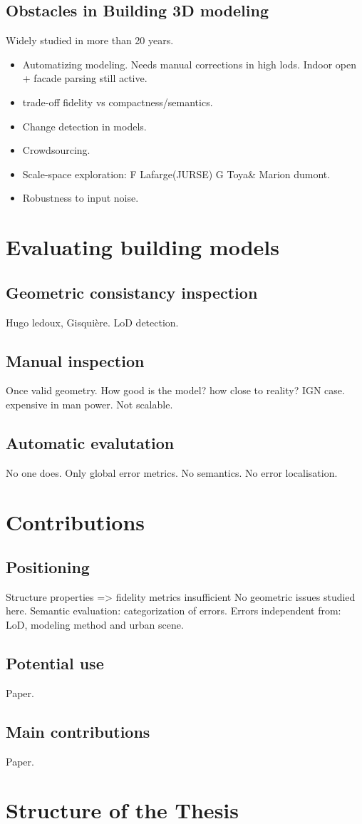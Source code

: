     \subsection{Obstacles in Building 3D modeling}
        \label{subsec::introduction::urban_3d_reconstruction::challenges}
        Widely studied in more than 20 years.\\
        \begin{itemize}
            \item Automatizing modeling. Needs manual corrections in high lods. Indoor open + facade parsing still active.
            \item trade-off fidelity vs compactness/semantics.
            \item Change detection in models.
            \item Crowdsourcing.
            \item Scale-space exploration: F Lafarge(JURSE) G Toya\& Marion dumont.
            \item Robustness to input noise.
        \end{itemize}
\section{Evaluating building models}
    \label{sec::introduction::building_model_evaluation}
    \subsection{Geometric consistancy inspection}
        Hugo ledoux, Gisquière. LoD detection.
    \subsection{Manual inspection}
        Once valid geometry. How good is the model? how close to reality?
        IGN case.
        expensive in man power. Not scalable.
    \subsection{Automatic evalutation}
        No one does. Only global error metrics. No semantics. No error localisation.
\section{Contributions}
    \label{sec::introduction::contributions}
    \subsection{Positioning}
        Structure properties => fidelity metrics insufficient
        No geometric issues studied here.
        Semantic evaluation: categorization of errors.
        Errors independent from: LoD, modeling method and urban scene.
    \subsection{Potential use}
        Paper.
    \subsection{Main contributions}
        Paper.
\section{Structure of the Thesis}
    \label{sec::introduction::structure_of_thesis}
